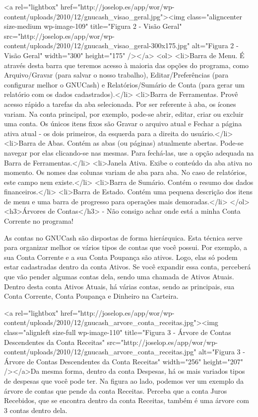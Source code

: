 <a rel="lightbox" href="http://joselop.es/app/wor/wp-content/uploads/2010/12/gnucash_visao_geral.jpg"><img class="aligncenter size-medium wp-image-109" title="Figura 2 - Visão Geral" src="http://joselop.es/app/wor/wp-content/uploads/2010/12/gnucash_visao_geral-300x175.jpg" alt="Figura 2 - Visão Geral" width="300" height="175" /></a>
<ol>
    <li>Barra de Menu. É através desta barra que teremos acesso à maioria das opções do programa, como Arquivo/Gravar (para salvar o nosso trabalho), Editar/Preferências (para configurar melhor o GNUCash) e Relatórios/Sumário de Conta (para gerar um relatório com os dados cadastrados).</li>
    <li>Barra de Ferramentas. Provê acesso rápido a tarefas da aba selecionada. Por ser referente à aba, os ícones variam. Na conta principal, por exemplo, pode-se abrir, editar, criar ou excluir uma conta. Os únicos itens fixos são Gravar o arquivo atual e Fechar a página ativa atual - os dois primeiros, da esquerda para a direita do usuário.</li>
    <li>Barra de Abas. Contém as abas (ou páginas) atualmente abertas. Pode-se navegar por elas clicando-se nas mesmas. Para fechá-las, use a opção adequada na Barra de Ferramentas.</li>
    <li>Janela Ativa. Exibe o conteúdo da aba ativa no momento. Os nomes das colunas variam de aba para aba. No caso de relatórios, este campo nem existe.</li>
    <li>Barra de Sumário. Contém o resumo dos dados financeiros.</li>
    <li>Barra de Estado. Contém uma pequena descrição dos itens de menu e uma barra de progresso para operações mais demoradas.</li>
</ol>
<h3>Árvores de Contas</h3>
- Não consigo achar onde está a minha Conta Corrente no programa!

As contas no GNUCash são dispostas de forma hierárquica. Esta técnica serve para organizar melhor os vários tipos de contas que você possui. Por exemplo, a sua Conta Corrente e a sua Conta Poupança são ativos. Logo, elas só podem estar cadastradas dentro da conta Ativos. Se você expandir essa conta, perceberá que vão pender algumas contas dela, sendo uma chamada de Ativos Atuais. Dentro desta conta Ativos Atuais, há várias contas, sendo as principais, sua Conta Corrente, Conta Poupança e Dinheiro na Carteira.

<a rel="lightbox" href="http://joselop.es/app/wor/wp-content/uploads/2010/12/gnucash_arvore_conta_receitas.jpg"><img class="alignleft size-full wp-image-110" title="Figura 3 - Árvore de Contas Descendentes da Conta Receitas" src="http://joselop.es/app/wor/wp-content/uploads/2010/12/gnucash_arvore_conta_receitas.jpg" alt="Figura 3 - Árvore de Contas Descendentes da Conta Receitas" width="256" height="207" /></a>Da mesma forma, dentro da conta Despesas, há os mais variados tipos de despesas que você pode ter. Na figura ao lado, podemos ver um exemplo da árvore de contas que pende da conta Receitas. Perceba que a conta Juros Recebidos, que se encontra dentro da conta Receitas, também é uma árvore com 3 contas dentro dela.

